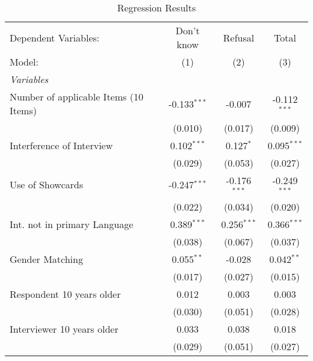 
\begin{table}[htbp]
   \caption{Regression Results}
   \centering
   \begin{tabular}{lccc}
      \tabularnewline \midrule \midrule
      Dependent Variables:                  & Don't know              & Refusal                 & Total\\  
      Model:                                & (1)                     & (2)                     & (3)\\  
      \midrule
      \emph{Variables}\\
      Number of applicable Items (10 Items) & -0.133$^{***}$          & -0.007                  & -0.112$^{***}$\\   
                                            & (0.010)                 & (0.017)                 & (0.009)\\   
      Interference of Interview             & 0.102$^{***}$           & 0.127$^{*}$             & 0.095$^{***}$\\   
                                            & (0.029)                 & (0.053)                 & (0.027)\\   
      Use of Showcards                      & -0.247$^{***}$          & -0.176$^{***}$          & -0.249$^{***}$\\   
                                            & (0.022)                 & (0.034)                 & (0.020)\\   
      Int. not in primary Language          & 0.389$^{***}$           & 0.256$^{***}$           & 0.366$^{***}$\\   
                                            & (0.038)                 & (0.067)                 & (0.037)\\   
      Gender Matching                       & 0.055$^{**}$            & -0.028                  & 0.042$^{**}$\\   
                                            & (0.017)                 & (0.027)                 & (0.015)\\   
      Respondent 10 years older             & 0.012                   & 0.003                   & 0.003\\   
                                            & (0.030)                 & (0.051)                 & (0.028)\\   
      Interviewer 10 years older            & 0.033                   & 0.038                   & 0.018\\   
                                            & (0.029)                 & (0.051)                 & (0.027)\\   

\end{tabular}
\end{table}
